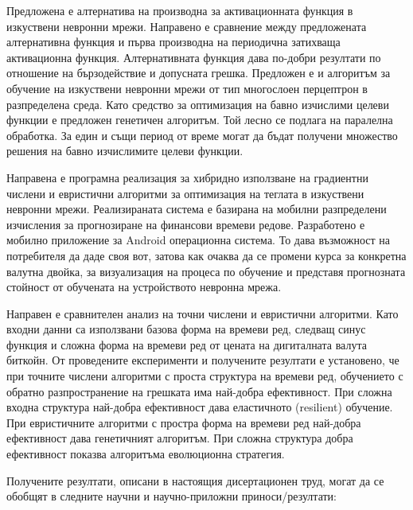 Предложена е алтернатива на производна за активационната функция в изкуствени невронни мрежи. Направено е сравнение между предложената алтернативна функция и първа производна на периодична затихваща активационна функция. Алтернативната функция дава по-добри резултати по отношение на бързодействие и допусната грешка. Предложен е и алгоритъм за обучение на изкуствени невронни мрежи от тип многослоен перцептрон в разпределена среда. Като средство за оптимизация на бавно изчислими целеви функции е предложен генетичен алгоритъм. Той лесно се подлага на паралелна обработка. За един и същи период от време могат да бъдат получени множество решения на бавно изчислимите целеви функции.

Направена е програмна реализация за хибридно използване на градиентни числени и евристични алгоритми за оптимизация на теглата в изкуствени невронни мрежи. Реализираната система е базирана на мобилни разпределени изчисления за прогнозиране на финансови времеви редове. Разработено е мобилно приложение за Android операционна система. То дава възможност на потребителя да даде своя вот, затова как очаква да се промени курса за конкретна валутна двойка, за визуализация на процеса по обучение и представя прогнозната стойност от обучената на устройството невронна мрежа.

Направен е сравнителен анализ на точни числени и евристични алгоритми. Като входни данни са използвани базова форма на времеви ред, следващ синус функция и сложна форма на времеви ред от цената на дигиталната валута биткойн. От проведените експерименти и получените резултати е установено, че при точните числени алгоритми с проста структура на времеви ред, обучението с обратно разпространение на грешката има най-добра ефективност. При сложна входна структура най-добра ефективност дава еластичното (resilient) обучение. При евристичните алгоритми с простра форма на времеви ред най-добра ефективност дава генетичният алгоритъм. При сложна структура добра ефективност показва алгоритъма еволюционна стратегия.

Получените резултати, описани в настоящия дисертационен труд, могат да се обобщят в следните научни и научно-приложни приноси/резултати:

